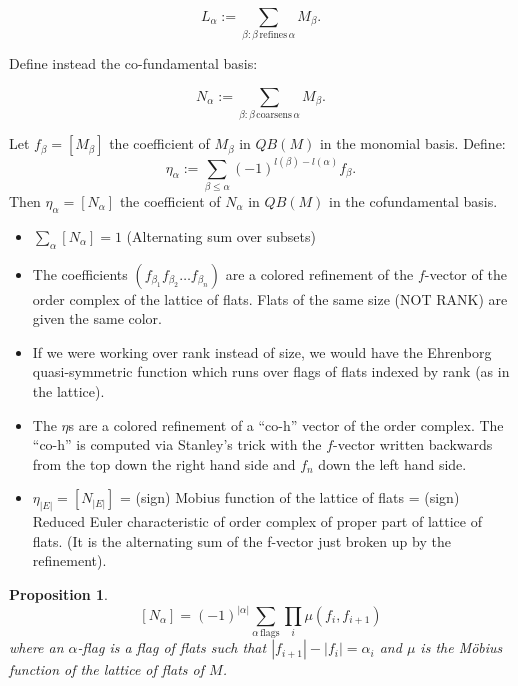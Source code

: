 \documentclass[12pt]{amsart}
\newtheorem{proposition}[definition]{Proposition}
\begin{document}
$$ L_{\alpha} := \sum_{\beta : \beta \, \textrm{refines} \, \alpha} M_{\beta}.$$


Define instead the co-fundamental basis:

$$ N_{\alpha} := \sum_{\beta : \beta \, \textrm{coarsens} \, \alpha} M_{\beta}.$$


Let $f_{\beta} = [M_{\beta}]$ the coefficient of $M_{\beta}$ in
$QB(M)$ in the monomial basis.  Define: 
$$\eta_{\alpha} := \sum_{\beta \leq \alpha} (-1)^{l(\beta)-l(\alpha)}f_{\beta}.$$
Then $\eta_{\alpha} = [N_{\alpha}]$ the coefficient of $N_{\alpha}$ in $QB(M)$ in the cofundamental basis.

\begin{itemize}

\item $\sum_{\alpha} [N_{\alpha}] = 1$ (Alternating sum over subsets)

\item The coefficients $(f_{\beta_1}f_{\beta_2} \dots f_{\beta_n})$ are
a colored refinement of the $f$-vector of the order complex of the
lattice of flats. Flats of the same size (NOT RANK) are given the same
color.

\item If we were working over rank instead of size, we would have the Ehrenborg quasi-symmetric function which runs over flags of flats indexed by rank (as in the lattice).

\item The $\eta$s are a colored refinement of a ``co-h'' vector of the
order complex.  The ``co-h'' is computed via Stanley's trick with the
$f$-vector written backwards from the top down the right hand side and
$f_n$ down the left hand side.

\item $\eta_{|E|} = [N_{|E|}]$ = (sign) Mobius function of the lattice
of flats = (sign) Reduced Euler characteristic of order complex of
proper part of lattice of flats. (It is the alternating sum of the
f-vector just broken up by the refinement).

\end{itemize}



\begin{proposition}
$$[N_{\alpha}] = (-1)^{|\alpha|} \sum_{\alpha \, \textrm{flags}} \prod_i \mu(f_i,f_{i+1})$$
where an $\alpha$-flag is a flag of flats such that $|f_{i+1}| - |f_i| = \alpha_i$ and $\mu$ is the M\"{o}bius function of the lattice of flats of $M$.
\end{proposition}
\end{document}
